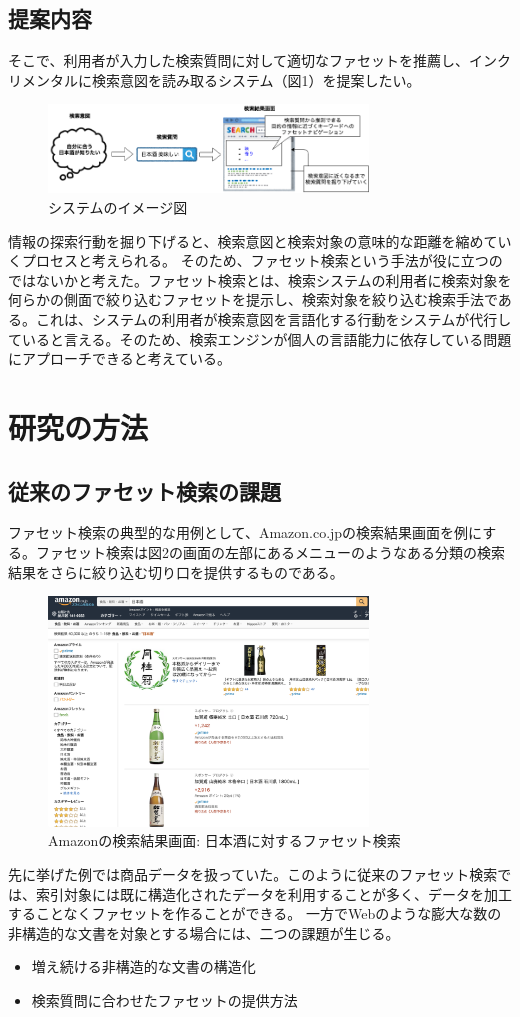 \documentclass[a4j,10pt, twocolumn]{jarticle}
\begin{document}
\subsection{提案内容}

 そこで、利用者が入力した検索質問に対して適切なファセットを推薦し、インクリメンタルに検索意図を読み取るシステム（図1）を提案したい。

 \begin{figure}[h]
   \includegraphics[width=85mm]{./new_ir_with_navi.png}
   \caption{システムのイメージ図}
 \end{figure}
 
 情報の探索行動を掘り下げると、検索意図と検索対象の意味的な距離を縮めていくプロセスと考えられる。 そのため、ファセット検索という手法が役に立つのではないかと考えた。ファセット検索とは、検索システムの利用者に検索対象を何らかの側面で絞り込むファセットを提示し、検索対象を絞り込む検索手法である\cite{faceted}。これは、システムの利用者が検索意図を言語化する行動をシステムが代行していると言える。そのため、検索エンジンが個人の言語能力に依存している問題にアプローチできると考えている。
\section{研究の方法}
\subsection{従来のファセット検索の課題}
 ファセット検索の典型的な用例として、Amazon.co.jp\cite{amazon}の検索結果画面を例にする。ファセット検索は図2の画面の左部にあるメニューのようなある分類の検索結果をさらに絞り込む切り口を提供するものである。
 \begin{figure}[h]
   \includegraphics[width=85mm]{./amazon.png}
   \caption{Amazonの検索結果画面: 日本酒に対するファセット検索}
 \end{figure}
  先に挙げた例では商品データを扱っていた。このように従来のファセット検索では、索引対象には既に構造化されたデータを利用することが多く、データを加工することなくファセットを作ることができる。
  一方でWebのような膨大な数の非構造的な文書を対象とする場合には、二つの課題が生じる。
\begin{itemize}
  \item 増え続ける非構造的な文書の構造化
  \item 検索質問に合わせたファセットの提供方法
\end{itemize}
\end{document}
